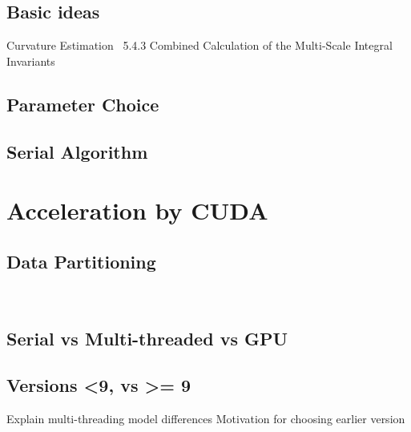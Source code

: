 \documentclass{article}
\begin{document}
\subsection{Basic ideas}
Curvature Estimation~\cite[p.~36]{Mara12}
5.4.3 Combined Calculation of the Multi-Scale Integral Invariants~\cite[p.~144]{Mara12}
\subsection{Parameter Choice}
\subsection{Serial Algorithm}
\section{Acceleration by CUDA}
\subsection{Data Partitioning}~\cite[p.~357]{Lang17}
\subsection{Serial vs Multi-threaded vs GPU}
\subsection{Versions <9, vs >= 9}
Explain multi-threading model differences
Motivation for choosing earlier version
\end{document}
